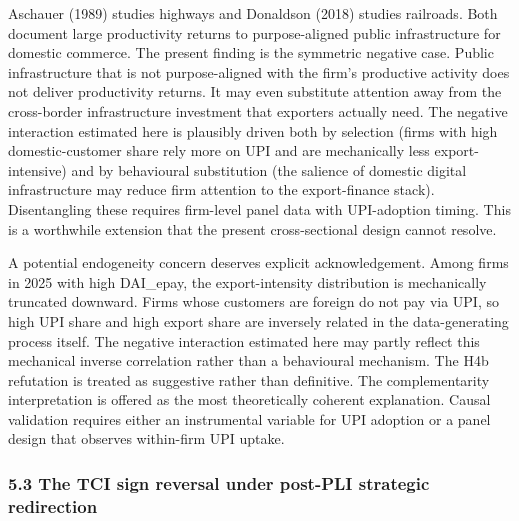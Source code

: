 \documentclass[
  12pt,a4paper]{article}
\begin{document}
Aschauer (1989) studies highways and Donaldson (2018) studies railroads.
Both document large productivity returns to purpose-aligned public
infrastructure for domestic commerce. The present finding is the
symmetric negative case. Public infrastructure that is not
purpose-aligned with the firm's productive activity does not deliver
productivity returns. It may even substitute attention away from the
cross-border infrastructure investment that exporters actually need. The
negative interaction estimated here is plausibly driven both by
selection (firms with high domestic-customer share rely more on UPI and
are mechanically less export-intensive) and by behavioural substitution
(the salience of domestic digital infrastructure may reduce firm
attention to the export-finance stack). Disentangling these requires
firm-level panel data with UPI-adoption timing. This is a worthwhile
extension that the present cross-sectional design cannot resolve.

A potential endogeneity concern deserves explicit acknowledgement. Among
firms in 2025 with high DAI\_epay, the export-intensity distribution is
mechanically truncated downward. Firms whose customers are foreign do
not pay via UPI, so high UPI share and high export share are inversely
related in the data-generating process itself. The negative interaction
estimated here may partly reflect this mechanical inverse correlation
rather than a behavioural mechanism. The H4b refutation is treated as
suggestive rather than definitive. The complementarity interpretation is
offered as the most theoretically coherent explanation. Causal
validation requires either an instrumental variable for UPI adoption or
a panel design that observes within-firm UPI uptake.

\hypertarget{the-tci-sign-reversal-under-post-pli-strategic-redirection}{%
\subsubsection{5.3 The TCI sign reversal under post-PLI strategic
redirection}\label{the-tci-sign-reversal-under-post-pli-strategic-redirection}}
\end{document}
